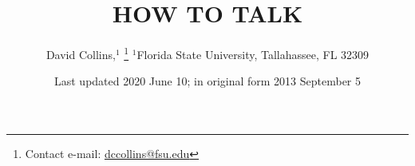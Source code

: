 
\title[Title: Short]{HOW TO TALK}

\author[Hound Dog]{David Collins,$^{1}$%
\thanks{Contact e-mail: \href{mailto:dccollins@fsu.edu}{dccollins@fsu.edu}}%
$^{1}$Florida State University, Tallahassee, FL 32309}

\date{Last updated 2020 June 10; in original form 2013 September 5}


